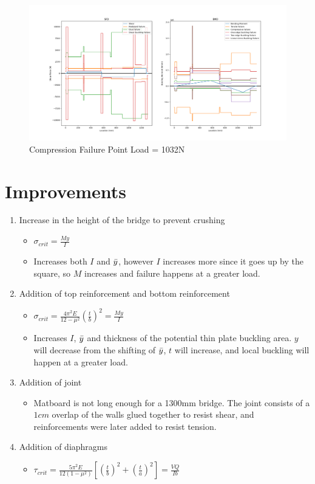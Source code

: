 \documentclass[11pt,twocolumn,letterpaper]{article}
\begin{document}
\begin{figure}[ht!]
  \centering
    \includegraphics[width=.4\textwidth]{figures/SBPointFail.png}
    \caption {Compression Failure Point Load = 1032N}
  \hfill
\end{figure}

\section*{Improvements}
\begin{enumerate}
    \item Increase in the height of the bridge to prevent crushing
    \begin{itemize}
        \item $\sigma_{crit} = \frac{My}{I}$
        \item Increases both $I$ and $\Bar{y}$, however $I$ increases more since it goes up by the square, so $M$ increases and failure happens at a greater load.
    \end{itemize}
    \item Addition of top reinforcement and bottom reinforcement
    \begin{itemize}
        \item $\sigma_{crit} = \frac{4\pi^2E}{12-\mu^2}\left(\frac{t}{b}\right)^2 = \frac{My}{I}$
        \item Increases $I$, $\Bar{y}$ and thickness of the potential thin plate buckling area. $y$ will decrease from the shifting of $\Bar{y}$, $t$ will increase, and local buckling will happen at a greater load. 
    \end{itemize}
    \item Addition of joint
    \begin{itemize}
        \item Matboard is not long enough for a 1300mm bridge. The joint consists of a $1\si{cm}$ overlap of the walls glued together to resist shear, and reinforcements were later added to resist tension.
    \end{itemize}
    \item Addition of diaphragms
    \begin{itemize}
        \item $\tau_{crit} = \frac{5\pi^2E}{12(1-\mu^2)}\left[\left(\frac{t}{b}\right)^2+\left(\frac{t}{a}\right)^2\right] = \frac{VQ}{Ib}$

\end{itemize}
\end{enumerate}
\end{document}
